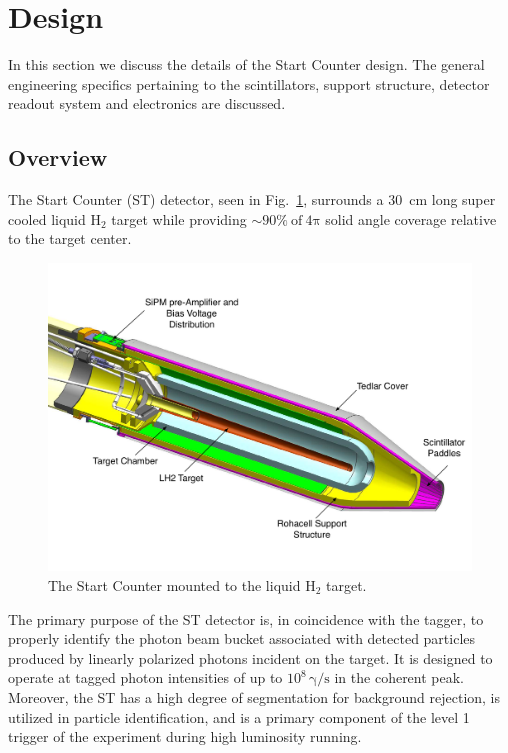 \section{Design} \label{sec:design}

In this section we discuss the details of the \gx{} Start Counter design.  The general engineering specifics pertaining to the scintillators, support structure, detector readout system and electronics are discussed.

\subsection{Overview} \label{sec:design_overview}
The Start Counter (ST) detector, seen in Fig.~\ref{fig:sttargetiso}, surrounds a 30~cm long super cooled liquid $\mathrm{H_{2}}$ target while providing $\sim 90 \%\ \mathrm{of\ 4 \pi}$ solid angle coverage relative to the target center.
	\begin{figure}[!htb]
		\centering
		\includegraphics[width=1.0\columnwidth]{design/figs/start_counter_all.pdf}
		\caption{The \gx{} Start Counter mounted to the liquid $\mathrm{H_2}$ target.}
		\label{fig:sttargetiso}
	\end{figure}
The primary purpose of the ST detector is, in coincidence with the tagger, to properly identify the photon beam bucket associated with detected particles produced by linearly polarized photons incident on the target. It is designed to operate at tagged photon intensities of up to $10^{8}\,\mathrm{\gamma/s}$ in the coherent peak.  Moreover, the ST has a high degree of segmentation for background rejection, is utilized in particle identification, and is a primary component of the level 1 trigger of the \gx{} experiment during high luminosity running\cite{pooser16}.

